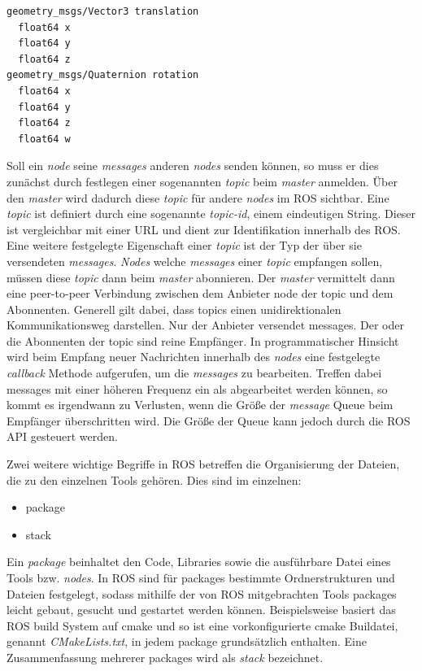 \begin{lstlisting}[caption=ROS transformation message, label=lst:transform]
geometry_msgs/Vector3 translation
  float64 x
  float64 y
  float64 z
geometry_msgs/Quaternion rotation
  float64 x
  float64 y
  float64 z
  float64 w
\end{lstlisting}

Soll ein \textit{node} seine \textit{messages} anderen \textit{nodes} senden
können, so muss er dies zunächst durch festlegen einer sogenannten
\textit{topic} beim \textit{master} anmelden. Über den \textit{master} wird
dadurch diese \textit{topic} für andere \textit{nodes} im ROS sichtbar. Eine
\textit{topic} ist definiert durch eine sogenannte \textit{topic-id}, einem
eindeutigen String. Dieser ist vergleichbar mit einer URL und dient zur
Identifikation innerhalb des ROS. Eine weitere festgelegte
Eigenschaft einer \textit{topic} ist der Typ der über sie versendeten
\textit{messages}. \textit{Nodes} welche \textit{messages} einer
\textit{topic} empfangen sollen, müssen diese \textit{topic} dann beim
\textit{master} abonnieren. Der \textit{master} vermittelt dann eine
peer-to-peer Verbindung zwischen dem Anbieter node der topic und dem
Abonnenten. Generell gilt dabei, dass topics einen unidirektionalen
Kommunikationsweg darstellen. Nur der Anbieter versendet messages.
Der oder die Abonnenten der topic sind reine Empfänger. 
In programmatischer Hinsicht wird beim Empfang neuer Nachrichten innerhalb des
\textit{nodes} eine festgelegte \textit{callback} Methode aufgerufen, um die
\textit{messages} zu bearbeiten. Treffen dabei messages mit einer höheren
Frequenz ein als abgearbeitet werden können, so kommt es irgendwann zu
Verlusten, wenn die Größe der \textit{message} Queue beim Empfänger überschritten
wird. Die Größe der Queue kann jedoch durch die ROS API gesteuert werden.  

Zwei weitere wichtige Begriffe in ROS betreffen die Organisierung der
Dateien, die zu den einzelnen Tools gehören. Dies sind im einzelnen:

\begin{itemize}
  \item package
  \item stack
\end{itemize}

Ein \textit{package} beinhaltet den Code, Libraries sowie die ausführbare Datei
eines Tools bzw. \textit{nodes}. In ROS sind für packages bestimmte
Ordnerstrukturen und Dateien festgelegt, sodass mithilfe der von ROS
mitgebrachten Tools packages leicht gebaut, gesucht und gestartet
werden können. Beispielsweise basiert das ROS build System auf cmake und so ist
eine vorkonfigurierte cmake Buildatei, genannt \textit{CMakeLists.txt}, in jedem
package grundsätzlich enthalten. Eine Zusammenfassung mehrerer
packages wird als \textit{stack} bezeichnet. 

